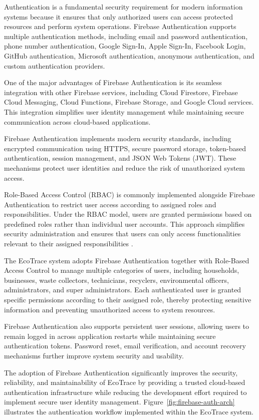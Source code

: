 Authentication is a fundamental security requirement for modern information
systems because it ensures that only authorized users can access protected
resources and perform system operations. Firebase Authentication supports
multiple authentication methods, including email and password authentication,
phone number authentication, Google Sign-In, Apple Sign-In, Facebook Login,
GitHub authentication, Microsoft authentication, anonymous authentication, and
custom authentication providers.

One of the major advantages of Firebase Authentication is its seamless
integration with other Firebase services, including Cloud Firestore, Firebase Cloud
Messaging, Cloud Functions, Firebase Storage, and Google Cloud services. This
integration simplifies user identity management while maintaining secure
communication across cloud-based applications.

Firebase Authentication implements modern security standards, including
encrypted communication using HTTPS, secure password storage, token-based
authentication, session management, and JSON Web Tokens (JWT). These
mechanisms protect user identities and reduce the risk of unauthorized system
access.

Role-Based Access Control (RBAC) is commonly implemented alongside
Firebase Authentication to restrict user access according to assigned roles and
responsibilities. Under the RBAC model, users are granted permissions based on
predefined roles rather than individual user accounts. This approach simplifies
security administration and ensures that users can only access functionalities
relevant to their assigned responsibilities \citep{sandhu1996}.

The EcoTrace system adopts Firebase Authentication together with Role-Based
Access Control to manage multiple categories of users, including households,
businesses, waste collectors, technicians, recyclers, environmental officers,
administrators, and super administrators. Each authenticated user is granted
specific permissions according to their assigned role, thereby protecting sensitive
information and preventing unauthorized access to system resources.

Firebase Authentication also supports persistent user sessions, allowing users
to remain logged in across application restarts while maintaining secure
authentication tokens. Password reset, email verification, and account recovery
mechanisms further improve system security and usability.

The adoption of Firebase Authentication significantly improves the security,
reliability, and maintainability of EcoTrace by providing a trusted cloud-based
authentication infrastructure while reducing the development effort required to
implement secure user identity management. Figure~\ref{fig:firebase-auth-arch}
illustrates the authentication workflow implemented within the EcoTrace system.

